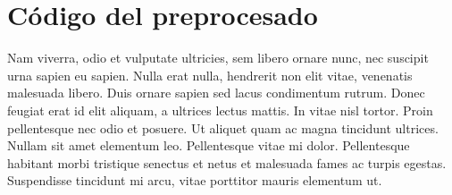 \chapter{Código del preprocesado}\label{app:preprocesado}

Nam viverra, odio et vulputate ultricies, sem libero ornare nunc, nec suscipit urna sapien eu sapien. Nulla erat nulla, hendrerit non elit vitae, venenatis malesuada libero. Duis ornare sapien sed lacus condimentum rutrum. Donec feugiat erat id elit aliquam, a ultrices lectus mattis. In vitae nisl tortor. Proin pellentesque nec odio et posuere. Ut aliquet quam ac magna tincidunt ultrices. Nullam sit amet elementum leo. Pellentesque vitae mi dolor. Pellentesque habitant morbi tristique senectus et netus et malesuada fames ac turpis egestas. Suspendisse tincidunt mi arcu, vitae porttitor mauris elementum ut.


